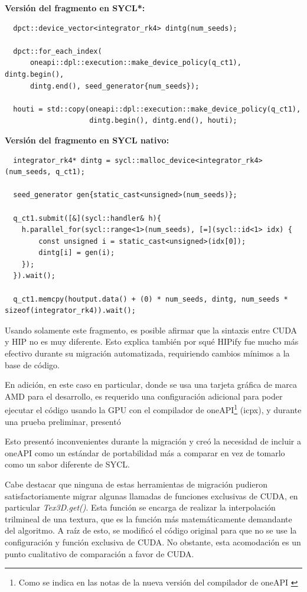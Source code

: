 \textbf{Versión del fragmento en SYCL*:}

\begin{lstlisting}
  dpct::device_vector<integrator_rk4> dintg(num_seeds); 

  dpct::for_each_index(
      oneapi::dpl::execution::make_device_policy(q_ct1), dintg.begin(),
      dintg.end(), seed_generator{num_seeds}); 

  houti = std::copy(oneapi::dpl::execution::make_device_policy(q_ct1),
                    dintg.begin(), dintg.end(), houti); 
\end{lstlisting}

\textbf{Versión del fragmento en SYCL nativo:}

\begin{lstlisting}
  integrator_rk4* dintg = sycl::malloc_device<integrator_rk4>(num_seeds, q_ct1);

  seed_generator gen{static_cast<unsigned>(num_seeds)};

  q_ct1.submit([&](sycl::handler& h){
    h.parallel_for(sycl::range<1>(num_seeds), [=](sycl::id<1> idx) {
        const unsigned i = static_cast<unsigned>(idx[0]);
        dintg[i] = gen(i);
    });
  }).wait();

  q_ct1.memcpy(houtput.data() + (0) * num_seeds, dintg, num_seeds * sizeof(integrator_rk4)).wait();
\end{lstlisting}


Usando solamente este fragmento, es posible afirmar que la sintaxis entre CUDA y HIP no es muy diferente. Esto explica también por squé HIPify fue mucho más efectivo durante su migración automatizada, requiriendo cambios mínimos a la base de código.

En adición, en este caso en particular, donde se usa una tarjeta gráfica de marca AMD para el desarrollo, es requerido una configuración adicional para poder ejecutar el código usando la GPU con el compilador de oneAPI\footnote{Como se indica en las notas de la nueva versión del compilador de oneAPI \cite{intel_technologies_intel_2026} } (icpx), y durante una prueba preliminar, presentó

Esto presentó inconvenientes durante la migración y creó la necesidad de incluir a oneAPI como un estándar de portabilidad más a comparar en vez de tomarlo como un sabor diferente de SYCL.

Cabe destacar que ninguna de estas herramientas de migración pudieron satisfactoriamente migrar algunas llamadas de funciones exclusivas de CUDA, en particular \textit{Tex3D.get()}. Esta función se encarga de realizar la interpolación trilmineal de una textura, que es la función más matemáticamente demandante del algoritmo. A raíz de esto, se modificó el código original para que no se use la configuración y función exclusiva de CUDA. No obstante, esta acomodación es un punto cualitativo de comparación a favor de CUDA.



